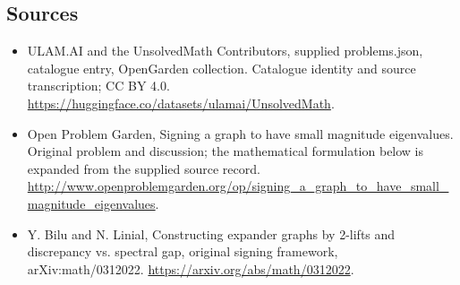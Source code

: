 \documentclass[11pt,a4paper]{article}
\begin{document}
\subsection{Sources}
\begin{itemize}
\item[S1] ULAM.AI and the UnsolvedMath Contributors, supplied problems.json, catalogue entry, OpenGarden collection. Catalogue identity and source transcription; CC BY 4.0.
\url{https://huggingface.co/datasets/ulamai/UnsolvedMath}.
\item[S2] Open Problem Garden, Signing a graph to have small magnitude eigenvalues. Original problem and discussion; the mathematical formulation below is expanded from the supplied source record.
\url{http://www.openproblemgarden.org/op/signing_a_graph_to_have_small_magnitude_eigenvalues}.
\item[S3] Y. Bilu and N. Linial, Constructing expander graphs by 2-lifts and discrepancy vs. spectral gap, original signing framework, arXiv:math/0312022.
\url{https://arxiv.org/abs/math/0312022}.
\end{itemize}
\end{document}

